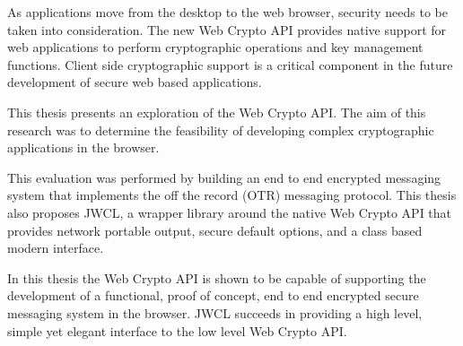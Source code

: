 As applications move from the desktop to the web browser, security needs to be taken into consideration. The new Web Crypto API provides native support for web applications to perform cryptographic operations and key management functions. Client side cryptographic support is a critical component in the future development of secure web based applications.


This thesis presents an exploration of the Web Crypto API. The aim of this research was to determine the feasibility of developing complex cryptographic applications in the browser.


This evaluation was performed by building an end to end encrypted messaging system that implements the off the record (OTR) messaging protocol. This thesis also proposes JWCL, a wrapper library around the native Web Crypto API that provides network portable output, secure default options, and a class based modern interface. 


In this thesis the Web Crypto API is shown to be capable of supporting the development of a functional, proof of concept, end to end encrypted secure messaging system in the browser. JWCL succeeds in providing a high level, simple yet elegant interface to the low level Web Crypto API.      

